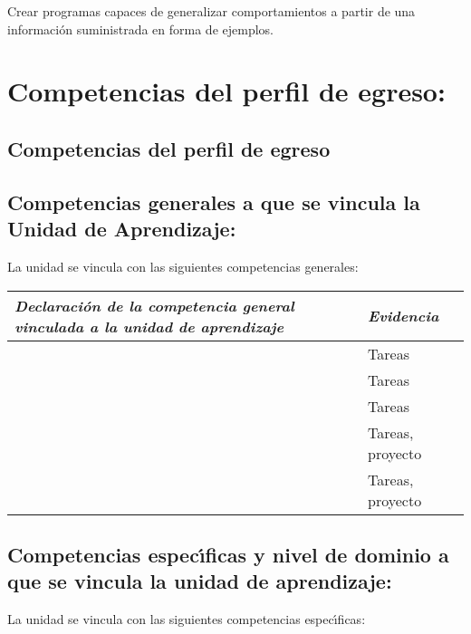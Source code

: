 \documentclass[10 pt]{article}
\begin{document}
Crear programas capaces de generalizar comportamientos a partir de una
informaci\'{o}n suministrada en forma de ejemplos.


\section{Competencias del perfil de egreso:}

\subsection{Competencias del perfil de egreso}




  
\subsection{Competencias generales a que se vincula la Unidad de
    Aprendizaje:}

  La unidad se vincula con las siguientes competencias generales:

  
  \begin{tabular}{|p{13cm}|p{13mm}|}
    \hline
    {\em Declaraci\'{o}n de la competencia general vinculada a la unidad
    de aprendizaje}
    & {\em Evidencia} \\ \hline
     & Tareas \\ \hline
     & Tareas \\ \hline
     & Tareas \\ \hline
     & Tareas, proyecto \\ \hline
     & Tareas, proyecto \\ \hline
    \end{tabular}

\newpage
    
\subsection{Competencias espec\'{\i}ficas y nivel de dominio a que se vincula la unidad de aprendizaje:}

  La unidad se vincula con las siguientes competencias espec\'{\i}ficas:
\end{document}
